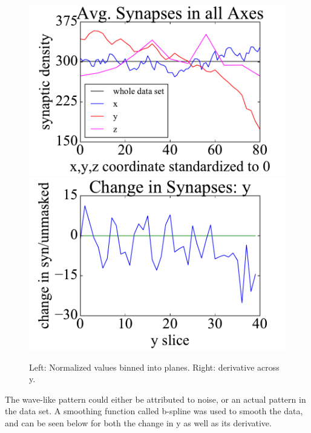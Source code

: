 \documentclass{article}
\begin{document}
\begin{figure}[h]
  \centering
  \includegraphics[scale=.3]{Fig7a}
  \includegraphics[scale=.3]{Fig7b}
  \caption{Left: Normalized values binned into planes. Right: derivative across y.}
\end{figure}

The wave-like pattern could either be attributed to noise, or an actual pattern in the data set. A smoothing function called b-spline was used to smooth the data, and can be seen below for both the change in y as well as its derivative.
\end{document}
